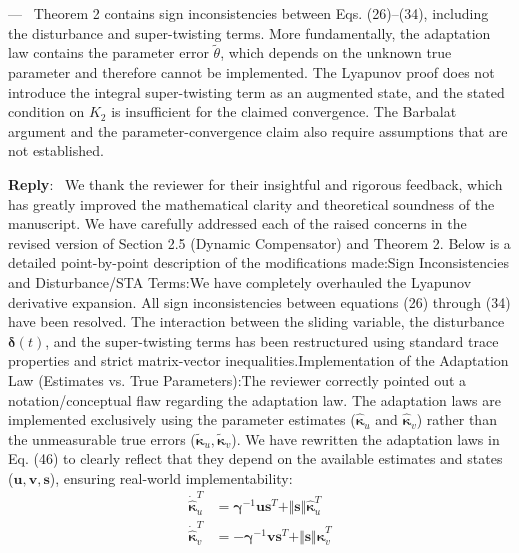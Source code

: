 \documentclass[11pt]{article}
\newcounter{reviewer}
\newcounter{point}[reviewer]
\renewcommand{\thepoint}{Comment\,\thereviewer.\arabic{point}}
\newenvironment{point}
   {\refstepcounter{point} \bigskip \noindent {\textbf{Reviewer~\thepoint} } ---\ }
   {\par }
\newenvironment{reply}
   {\medskip \noindent \color{blue} \begin{sf}\textbf{Reply}:\  }
   {\medskip \par \end{sf}}
\begin{document}
\begin{point}
Theorem 2 contains sign inconsistencies between Eqs. (26)–(34), including the disturbance and super-twisting terms. More fundamentally, the adaptation law contains the parameter error \(\tilde\theta\), which depends on the unknown true parameter and therefore cannot be implemented. The Lyapunov proof does not introduce the integral super-twisting term as an augmented state, and the stated condition on \(K_2\) is insufficient for the claimed convergence. The Barbalat argument and the parameter-convergence claim also require assumptions that are not established.
\end{point}

\begin{reply}
We thank the reviewer for their insightful and rigorous feedback, which has greatly improved the mathematical clarity and theoretical soundness of the manuscript. We have carefully addressed each of the raised concerns in the revised version of Section 2.5 (Dynamic Compensator) and Theorem 2. Below is a detailed point-by-point description of the modifications made:Sign Inconsistencies and Disturbance/STA Terms:We have completely overhauled the Lyapunov derivative expansion. All sign inconsistencies between equations (26) through (34) have been resolved. The interaction between the sliding variable, the disturbance $\boldsymbol{\delta}(t)$, and the super-twisting terms has been restructured using standard trace properties and strict matrix-vector inequalities.Implementation of the Adaptation Law (Estimates vs. True Parameters):The reviewer correctly pointed out a notation/conceptual flaw regarding the adaptation law. The adaptation laws are implemented exclusively using the parameter estimates ($\hat{\boldsymbol{\kappa}}_u$ and $\hat{\boldsymbol{\kappa}}_v$) rather than the unmeasurable true errors ($\tilde{\boldsymbol{\kappa}}_u, \tilde{\boldsymbol{\kappa}}_v$). We have rewritten the adaptation laws in Eq. (46) to clearly reflect that they depend on the available estimates and states ($\mathbf{u}, \mathbf{v}, \mathbf{s}$), ensuring real-world implementability:
\begin{eqnarray}
\dot{\hat{\boldsymbol{\kappa}}}_u^T &= \boldsymbol{\gamma}^{-1}\mathbf{u}\mathbf{s}^T + \Vert{}\mathbf{s}\Vert{}\hat{\boldsymbol{\kappa}}_u^T\\
\dot{\hat{\boldsymbol{\kappa}}}_v^T &= -\boldsymbol{\gamma}^{-1}\mathbf{v}\mathbf{s}^T + \Vert{}\mathbf{s}\Vert{}\hat{\boldsymbol{\kappa}}_v^T
\end{eqnarray}

\end{reply}
\end{document}
